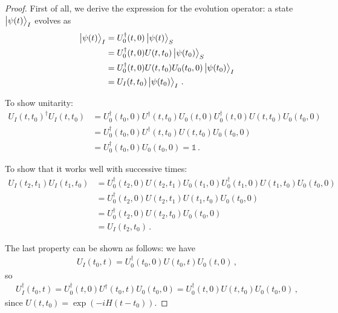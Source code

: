 \documentclass[main.tex]{subfiles}
\begin{document}
\begin{proof}
First of all, we derive the expression for the evolution operator: a state \(\ket{\psi (t)}_{I}\) evolves as
%
\begin{subequations}
\begin{align}
\ket{\psi (t)}_{I} &= U_0 ^\dag (t, 0) \ket{\psi (t)}_{S}  \\
&= U_0 ^\dag (t, 0) U (t, t_0 ) \ket{\psi (t_0 )}_{S}  \\
&= U_0 ^\dag (t, 0) U(t, t_0 ) U_0 (t_0, 0) \ket{\psi (t_0 )}_{I}  \\
&= U_{I} (t, t_0 ) \ket{\psi (t_0 )}_{I}
\,.
\end{align}
\end{subequations}

To show unitarity: 
%
\begin{subequations}
\begin{align}
U_I (t, t_0 ) ^\dag U_I (t, t_0 )
&= 
U_0 ^\dag(t_0 , 0)  
U ^\dag (t, t_0 )  
U_0 (t, 0) 
U_0 ^\dag (t, 0)  
U (t, t_0 ) 
U_0 (t_0 , 0)  \\
&= 
U_0 ^\dag(t_0 , 0)  
U ^\dag (t, t_0 )  
U (t, t_0 ) 
U_0 (t_0 , 0)  \\
&= 
U_0 ^\dag(t_0 , 0)  
U_0 (t_0 , 0)  
= \mathbb{1}
\,.
\end{align}
\end{subequations}

To show that it works well with successive times: 
%
\begin{subequations}
\begin{align}
U_I (t_2, t_1 ) U_I (t_1 , t_0 )
&= U_0 ^\dag (t_2 , 0) U (t_2, t_1 ) U_0 (t_1, 0)
U_0 ^\dag (t_1, 0) U(t_1, t_0 ) U_0 (t_0, 0)  \\
&= U_0 ^\dag (t_2 , 0) U (t_2, t_1 ) U(t_1, t_0 ) U_0 (t_0, 0)  \\
&= U_0 ^\dag (t_2 , 0) U (t_2, t_0 ) U_0 (t_0, 0)  \\
&= U_I (t_2, t_0 )
\,.
\end{align}
\end{subequations}

The last property can be shown as follows: we have
%
\begin{align}
U_I (t_0, t) = U_0 ^\dag (t_0 , 0) U(t_0, t) U_0 (t ,0 )
\,,
\end{align}
%
so 
%
\begin{align}
U_I ^\dag (t_0, t) 
= U_0 ^\dag (t, 0) U ^\dag (t_0 , t) U_0 (t_0, 0) 
= U_0 ^\dag (t, 0) U (t , t_0 ) U_0 (t_0, 0) 
\,,
\end{align}
%
since \(U(t, t_0 ) = \exp(-i H (t - t_0) )\). 
\end{proof}
\end{document}
